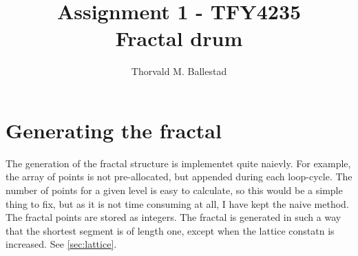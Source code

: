 \documentclass[a4paper, 12pt]{article}
\author{Thorvald M. Ballestad}
\title{Assignment 1 - TFY4235\\
  Fractal drum}
\begin{document}
\maketitle

\section{Generating the fractal}
The generation of the fractal structure is implementet quite naievly.
For example, the array of points is not pre-allocated, but appended during each loop-cycle.
The number of points for a given level is easy to calculate, so this would be a simple thing to fix, but as it is not time consuming at all, I have kept the naive method.\\

The fractal points are stored as integers.
The fractal is generated in such a way that the shortest segment is of length one, except when the lattice constatn is increased.
See \ref{sec:lattice}.
\end{document}
